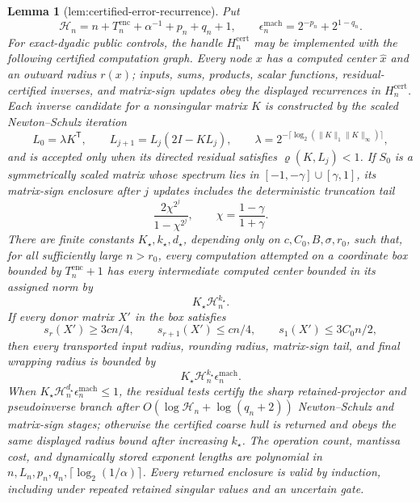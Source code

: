 \documentclass{article}
\newtheorem{lemma}{Lemma}
\begin{document}
\begin{lemma}[lem:certified-error-recurrence]\label{lem:certified-error-recurrence}
Put
\[
\mathcal H_n=n+T_n^{\mathrm{enc}}+\alpha^{-1}+p_n+q_n+1,
\qquad
\epsilon_n^{\mathrm{mach}}=2^{-p_n}+2^{1-q_n}.
\]
For exact-dyadic public controls, the handle \(H_n^{\mathrm{cert}}\) may be implemented with the following certified computation graph.  Every node \(x\) has a computed center \(\widehat x\) and an outward radius \(r(x)\); inputs, sums, products, scalar functions, residual-certified inverses, and matrix-sign updates obey the displayed recurrences in \(H_n^{\mathrm{cert}}\).  Each inverse candidate for a nonsingular matrix \(K\) is constructed by the scaled Newton--Schulz iteration
\[
L_0=\lambda K^{\mathsf T},\qquad
L_{j+1}=L_j(2I-KL_j),\qquad
\lambda=2^{-\lceil\log_2(\|K\|_1\|K\|_\infty)\rceil},
\]
and is accepted only when its directed residual satisfies \(\varrho(K,L_j)<1\).  If \(S_0\) is a symmetrically scaled matrix whose spectrum lies in \([-1,-\gamma]\cup[\gamma,1]\), its matrix-sign enclosure after \(j\) updates includes the deterministic truncation tail
\[
\frac{2\chi^{2^j}}{1-\chi^{2^j}},
\qquad
\chi=\frac{1-\gamma}{1+\gamma}.
\]
There are finite constants \(K_\star,k_\star,d_\star\), depending only on \(c,C_0,B,\sigma,r_0\), such that, for all sufficiently large \(n>r_0\), every computation attempted on a coordinate box bounded by \(T_n^{\mathrm{enc}}+1\) has every intermediate computed center bounded in its assigned norm by
\[
K_\star\mathcal H_n^{k_\star}.
\]
If every donor matrix \(X'\) in the box satisfies
\[
s_r(X')\ge3cn/4,\qquad s_{r+1}(X')\le cn/4,\qquad
s_1(X')\le3C_0n/2,
\]
then every transported input radius, rounding radius, matrix-sign tail, and final wrapping radius is bounded by
\[
K_\star\mathcal H_n^{k_\star}\epsilon_n^{\mathrm{mach}}.
\]
When \(K_\star\mathcal H_n^{d_\star}\epsilon_n^{\mathrm{mach}}\le1\), the residual tests certify the sharp retained-projector and pseudoinverse branch after \(O(\log\mathcal H_n+\log(q_n+2))\) Newton--Schulz and matrix-sign stages; otherwise the certified coarse hull is returned and obeys the same displayed radius bound after increasing \(k_\star\).  The operation count, mantissa cost, and dynamically stored exponent lengths are polynomial in \(n,L_n,p_n,q_n,\lceil\log_2(1/\alpha)\rceil\).  Every returned enclosure is valid by induction, including under repeated retained singular values and an uncertain gate.
\end{lemma}
\end{document}
